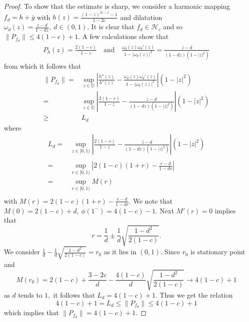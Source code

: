 \documentclass[10pt,a4paper]{amsart}
\begin{document}
\begin{proof}
		To show that the estimate is sharp, we consider a harmonic mapping $f_d=h+\overline{g}$ with $h(z)=\frac{(1-z)^{2c-1}-1}{1-2c}$ and dilatation $\omega_d(z)=\frac{z-d}{1-dz},~d\in(0,1).$ It is clear that $f_d\in \mathcal{H}_c$ and so $\|P_{f_d}\|\le 4(1-c)+1.$ A few calculations show that 
		\begin{align}
			P_h(z)=\frac{2(1-c)}{1-z}\quad\text{and}\quad \frac{\overline{\omega_d(z)}\omega_d'(z)}{1-|\omega_d(z)|^2}=\frac{\overline{z}-d}{(1-dz)(1-|z|^2)}
		\end{align}
		from which it follows that 
		\begin{align}
			\|P_{f_d}\|=&\sup_{z \in \mathbb{D}}\left|\frac{h''(z)}{h'(z)}-\frac{\overline{\omega_d(z)}\omega_d'(z)}{1-|\omega_d(z)|^2}\right|(1-|z|^2)\\\nonumber
			=&\sup_{z \in \mathbb{D}}\left|\frac{2(1-c)}{1-z}-\frac{\overline{z}-d}{(1-dz)(1-|z|^2)}\right|(1-|z|^2)\\\nonumber
			\ge & L_d
		\end{align}
		where 
		\begin{align}
			L_d=&\sup_{z \in [0,1)}\left|\frac{2(1-c)}{1-z}-\frac{\overline{z}-d}{(1-dz)(1-|z|^2)}\right|(1-|z|^2)\\\nonumber\\\nonumber
			=&\sup_{r \in [0,1)}\left|2(1-c)(1+r)-\frac{r-d}{1-dr}\right|\\\nonumber
			=&\sup_{r \in [0,1)}M(r)\\\nonumber
		\end{align}
		with $M(r)=2(1-c)(1+r)-\frac{r-d}{1-dr}.$ We note that $M(0)=2(1-c)+d,~\phi(1^-)=4(1-c)-1.$ Next $M'(r)=0$ implies that $$r=\frac{1}{d}\pm\frac{1}{d}\sqrt{\frac{1-d^2}{2(1-c)}}.$$ We consider $\frac{1}{d}-\frac{1}{d}\sqrt{\frac{1-d^2}{2(1-c)}}=r_0$ as it lies in $(0,1).$ Since $r_0$ is stationary point and $$M(r_0)=2(1-c)+\frac{3-2c}{d}-\frac{4(1-c)}{d}\sqrt{\frac{1-d^2}{2(1-c)}}\rightarrow 4(1-c)+1$$ as $d$ tends to $1,$ it follows that $L_d=4(1-c)+1.$ Thus we get the relation $$4(1-c)+1=L_d\le \|P_{f_d}\|\le 4(1-c)+1$$ which implies that $\|P_{f_d}\|=4(1-c)+1.$
	\end{proof}
\end{document}
